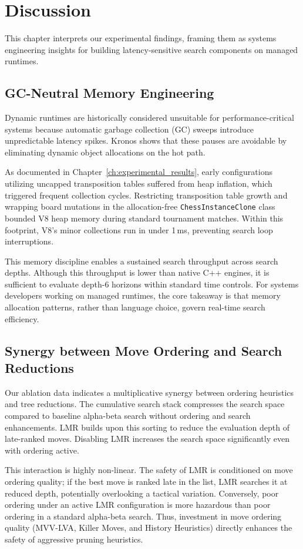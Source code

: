 \chapter{Discussion}
\label{ch:discussion}

This chapter interprets our experimental findings, framing them as systems engineering insights for building latency-sensitive search components on managed runtimes.

\section{GC-Neutral Memory Engineering}
Dynamic runtimes are historically considered unsuitable for performance-critical systems because automatic garbage collection (GC) sweeps introduce unpredictable latency spikes. Kronos shows that these pauses are avoidable by eliminating dynamic object allocations on the hot path.

As documented in Chapter~\ref{ch:experimental_results}, early configurations utilizing uncapped transposition tables suffered from heap inflation, which triggered frequent collection cycles. Restricting transposition table growth and wrapping board mutations in the allocation-free \texttt{ChessInstanceClone} class bounded V8 heap memory during standard tournament matches. Within this footprint, V8's minor collections run in under 1\,ms, preventing search loop interruptions.

This memory discipline enables a sustained search throughput across search depths. Although this throughput is lower than native C++ engines, it is sufficient to evaluate depth-6 horizons within standard time controls. For systems developers working on managed runtimes, the core takeaway is that memory allocation patterns, rather than language choice, govern real-time search efficiency.

\section{Synergy between Move Ordering and Search Reductions}
Our ablation data indicates a multiplicative synergy between ordering heuristics and tree reductions. The cumulative search stack compresses the search space compared to baseline alpha-beta search without ordering and search enhancements. LMR builds upon this sorting to reduce the evaluation depth of late-ranked moves. Disabling LMR increases the search space significantly even with ordering active.

This interaction is highly non-linear. The safety of LMR is conditioned on move ordering quality; if the best move is ranked late in the list, LMR searches it at reduced depth, potentially overlooking a tactical variation. Conversely, poor ordering under an active LMR configuration is more hazardous than poor ordering in a standard alpha-beta search. Thus, investment in move ordering quality (MVV-LVA, Killer Moves, and History Heuristics) directly enhances the safety of aggressive pruning heuristics.

